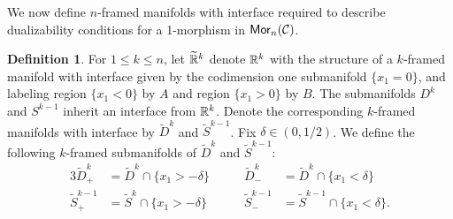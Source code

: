 \documentclass[10pt, reqno, twoside
, final
]{amsart}
\numberwithin{equation}{subsection}%
\theoremstyle{definition}
\newtheorem{defn}{Definition}[subsection]
\theoremstyle{definition}
\theoremstyle{definition}
\theoremstyle{definition}
\theoremstyle{definition}
\theoremstyle{definition}
\theoremstyle{definition}
\theoremstyle{definition}
\theoremstyle{definition}
\theoremstyle{plain}
\theoremstyle{definition}
\theoremstyle{plain}
\theoremstyle{definition}
\theoremstyle{plain}
\theoremstyle{definition}
\theoremstyle{definition}
\theoremstyle{plain}
\theoremstyle{plain}
\theoremstyle{definition}
\theoremstyle{plain}
\theoremstyle{plain}
\theoremstyle{plain}
\begin{document}
We now define $n$-framed manifolds  with interface required to describe dualizability conditions for a 1-morphism in $\mathsf{Mor}_n(\mathcal{C})$. 

\begin{defn}
    \label{cons:stratified-spheres}
For $1\leq k \leq n$, let $\widetilde{\mathbb{R}}^k$ denote $\mathbb{R}^k$ with the structure of a $k$-framed manifold with interface given by the codimension one submanifold $\{x_1=0\}$, and labeling region $\{x_1<0\}$ by $A$ and region $\{x_1>0\}$ by $B$. The submanifolds $D^k$ and $S^{k-1}$ inherit an interface from $\mathbb{R}^k$. Denote the corresponding $k$-framed manifolds with interface by $\widetilde{D}^{k}$ and $\widetilde{S}^{k-1}$. Fix $\delta \in (0,1/2)$. We define the following $k$-framed submanifolds of $\widetilde{D}^k$ and $\widetilde{S}^{k-1}$:
\begin{alignat*}{3}
    \widetilde{D}^k_+ &= \widetilde{D}^k \cap \{x_1 > -\delta\} &\qquad  \widetilde{D}^k_- &= \widetilde{D}^k \cap \{x_1 < \delta \} \\
    \widetilde{S}^{k-1}_+ &= \widetilde{S}^{k} \cap \{x_1 > -\delta \} &\qquad  \widetilde{S}^{k-1}_- &= \widetilde{S}^{k-1} \cap \{x_1 < \delta \}.
\end{alignat*} 
\end{defn}
\end{document}
